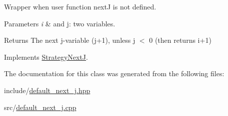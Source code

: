 \-Wrapper when user function next\-J is not defined. 


\begin{DoxyParams}{\-Parameters}
{\em i} & and j\-: two variables. \\
\hline
\end{DoxyParams}
\begin{DoxyReturn}{\-Returns}
\-The next j-\/variable (j+1), unless j $<$ 0 (then returns i+1) 
\end{DoxyReturn}


\-Implements \hyperlink{classStrategyNextJ_ab566c4e5827240b575d0e7445b7ba695}{\-Strategy\-Next\-J}.



\-The documentation for this class was generated from the following files\-:\begin{DoxyCompactItemize}
\item 
include/\hyperlink{default__next__j_8hpp}{default\-\_\-next\-\_\-j.\-hpp}\item 
src/\hyperlink{default__next__j_8cpp}{default\-\_\-next\-\_\-j.\-cpp}\end{DoxyCompactItemize}
